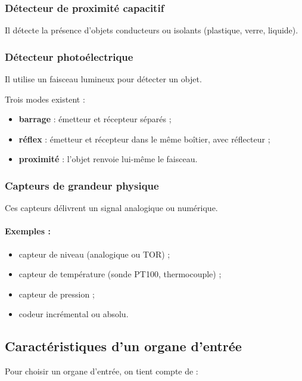 \subsubsection{Détecteur de proximité capacitif}

Il détecte la présence d'objets conducteurs ou isolants (plastique, verre, liquide).

\subsubsection{Détecteur photoélectrique}

Il utilise un faisceau lumineux pour détecter un objet.

Trois modes existent :

\begin{itemize}
    \item \textbf{barrage} : émetteur et récepteur séparés ;
    \item \textbf{réflex} : émetteur et récepteur dans le même boîtier, avec réflecteur ;
    \item \textbf{proximité} : l'objet renvoie lui-même le faisceau.
\end{itemize}

\subsubsection{Capteurs de grandeur physique}

Ces capteurs délivrent un signal analogique ou numérique.

\paragraph{Exemples :}
\begin{itemize}
    \item capteur de niveau (analogique ou TOR) ;
    \item capteur de température (sonde PT100, thermocouple) ;
    \item capteur de pression ;
    \item codeur incrémental ou absolu.
\end{itemize}

\subsection{Caractéristiques d'un organe d'entrée}

Pour choisir un organe d'entrée, on tient compte de :

